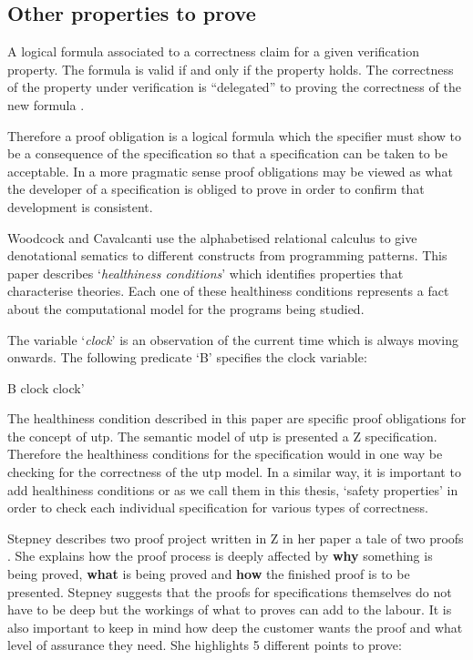 \subsection{Other properties to prove}
\label{subsec:propertiestoprove}

\begin{defin}
A logical formula associated to a correctness claim for a given verification property. The formula is valid if and only if the property holds. The correctness of the property under verification is “delegated” to proving the correctness of the new formula \cite{handbookofembed}.
\end{defin}

Therefore a proof obligation is a logical formula which the specifier must show to be a consequence of the specification so that a specification can be taken to be acceptable. In a more pragmatic sense proof obligations may be viewed as what the developer of a specification is obliged to prove in order to confirm that development is consistent.

Woodcock and Cavalcanti \cite{woodcock2004tutorial} use the alphabetised relational calculus to give denotational sematics to different constructs from programming patterns. This paper describes `\emph{healthiness conditions}' which identifies properties that characterise theories. Each one of these healthiness conditions represents a fact about the computational model for the programs being studied.

\begin{exam}
The variable `\emph{clock}' is an observation of the current time which is always moving onwards. The following predicate `B' specifies the clock variable:

\begin{zed}
B  clock \leq clock'
\end{zed}
\end{exam}

The healthiness condition described in this paper are specific proof obligations for the concept of \gls{utp}. The semantic model of \gls{utp} is presented a Z specification. Therefore the healthiness conditions for the specification would in one way be checking for the correctness of the \gls{utp} model. In a similar way, it is important to add healthiness conditions or as we call them in this thesis, `safety properties' in order to check each individual specification for various types of correctness.

Stepney describes two proof project written in Z in her paper a tale of two proofs \cite{stepney1998tale}. She explains how the proof process is deeply affected by \textbf{why} something is being proved, \textbf{what} is being proved and \textbf{how} the finished proof is to be presented. Stepney suggests that the proofs for specifications themselves do not have to be deep but the workings of what to proves can add to the labour. It is also important to keep in mind how deep the customer wants the proof and what level of assurance they need. She highlights 5 different points to prove:

